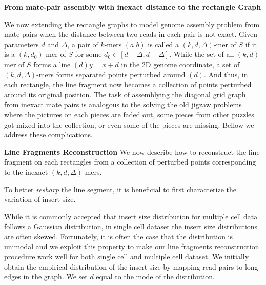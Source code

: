 \documentclass[a4paper]{article}
\begin{document}
\noindent
\textbf{From mate-pair assembly with inexact distance to the rectangle Graph}

We now extending the rectangle graphs to model genome assembly problem from mate pairs when the distance 
between two reads in each pair is not exact. Given parameters $d$ and $\Delta$, 
a pair of $k$-mers $(a|b)$ is called a $(k,d,\Delta)$-mer of $S$
if it is a $(k,d_0)$-mer of $S$ for some $d_0 \in [d-\Delta, d+ \Delta]$. While the set of all $(k,d)$-mer 
of $S$ forms a line $(d) y = x + d$ in the 2D genome coordinate, a set of $(k,d,\Delta)$-mers forms 
separated points perturbed around $(d)$. And thus, in each rectangle, the line fragment now becomes a collection of points 
perturbed around its original position.
The task of assemblying the diagonal grid graph from inexact mate pairs is analogous to 
the solving the old jigzaw problems where the pictures on each pieces are faded out, some pieces from other puzzles got mixed into 
the collection, or even some of the pieces are missing. Bellow we address these complications.

\noindent 
\textbf{Line Fragments Reconstruction} 
We now describe how to reconstruct the line fragment on each rectangles from a collection of perturbed points corresponding to the 
inexact $(k,d,\Delta)$ mers.  


 To better \emph{resharp}
the line segment, it is beneficial to first characterize the variation of insert size. 

While it is commonly accepted that insert size distribution for multiple cell data follows a Gaussian distribution,
in single cell dataset the insert size distributions are often skewed. Fortunately, it is often the case 
that the distribution is unimodal and we exploit this property to make our line fragments reconstruction procedure work well for
both single cell and multiple cell dataset. We initially obtain the empirical distribution of the insert size 
by mapping read pairs to long edges in the graph. We set $d$ equal to the mode of the distribution.  
\end{document}
